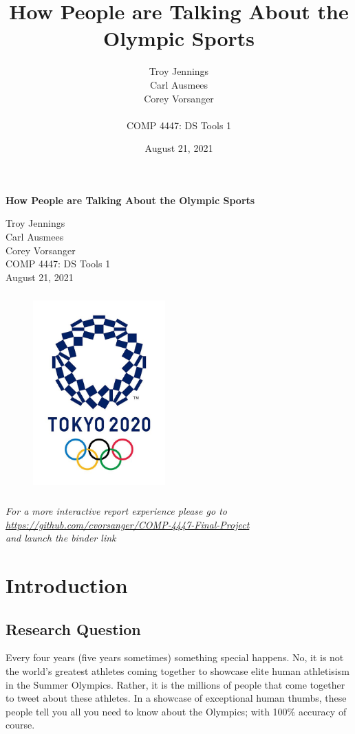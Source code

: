 \documentclass[12pt]{article}
\title{How People are Talking About the Olympic Sports}
\author{Troy Jennings\\Carl Ausmees\\Corey Vorsanger\\  \\COMP 4447: DS Tools 1}
\date{August 21, 2021}
\begin{document}
    \begin{titlepage}
        {\center\huge\bfseries How People are Talking About the Olympic Sports \par}
        \vspace{1.5cm}
        \begin{center}
            Troy Jennings\\
            Carl Ausmees\\
            Corey Vorsanger\\
            \medskip
            COMP 4447: DS Tools 1\\
            \bigskip
            August 21, 2021
        \end{center}
        \begin{figure}[htp]
            \centering
            \includegraphics[height=3in, width=2in]{tokyo.jpg}
        \end{figure}
        \begin{center}
            \textit{For a more interactive report experience please go to\\
            \href{https://github.com/cvorsanger/COMP-4447-Final-Project}{https://github.com/cvorsanger/COMP-4447-Final-Project}\\
            and launch the binder link}
        \end{center}
    \end{titlepage}

    \tableofcontents
    \newpage

    \section{Introduction}
        \subsection{Research Question}
            Every four years (five years sometimes) something special happens. No, it is not the world's greatest athletes coming together to showcase elite human athletisism in the Summer 
            Olympics. Rather, it is the millions of people that come together to tweet about these athletes. In a showcase of exceptional human thumbs, these people tell you all you need to know
            about the Olympics; with 100\% accuracy of course.\\ 
\end{document}
